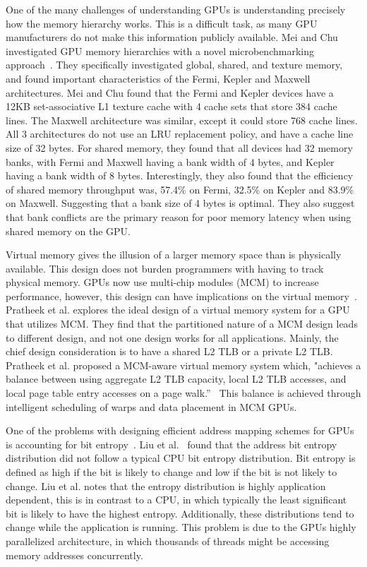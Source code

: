 One of the many challenges of understanding GPUs is understanding precisely how the memory hierarchy works.
This is a difficult task, as many GPU manufacturers do not make this information publicly available.
Mei and Chu investigated GPU memory hierarchies with a novel microbenchmarking approach~\cite{Mei2015}.
They specifically investigated global, shared, and texture memory, and found important characteristics of the Fermi, Kepler and Maxwell architectures.
Mei and Chu found that the Fermi and Kepler devices have a 12KB set-associative L1 texture cache with 4 cache sets that store 384 cache lines.
The Maxwell architecture was similar, except it could store 768 cache lines.
All 3 architectures do not use an LRU replacement policy, and have a cache line size of 32 bytes.
For shared memory, they found that all devices had 32 memory banks, with Fermi and Maxwell having a bank width of 4 bytes, and Kepler having a bank width of 8 bytes.
Interestingly, they also found that the efficiency of shared memory throughput was, 57.4\% on Fermi, 32.5\% on Kepler and 83.9\% on Maxwell.
Suggesting that a bank size of 4 bytes is optimal.
They also suggest that bank conflicts are the primary reason for poor memory latency when using shared memory on the GPU.

Virtual memory gives the illusion of a larger memory space than is physically available.
This design does not burden programmers with having to track physical memory.
GPUs now use multi-chip modules (MCM) to increase performance, however, this design can have implications on the virtual memory~\cite{Pratheek2023}.
Pratheek et al. explores the ideal design of a virtual memory system for a GPU that utilizes MCM.
They find that the partitioned nature of a MCM design leads to different design, and not one design works for all applications.
Mainly, the chief design consideration is to have a shared L2 TLB or a private L2 TLB.
Pratheek et al. proposed a MCM-aware virtual memory system which, "achieves a balance between using aggregate L2 TLB capacity, local L2 TLB accesses, and local page table entry accesses on a page walk.''~\cite{Pratheek2023}
This balance is achieved through intelligent scheduling of warps and data placement in MCM GPUs.

One of the problems with designing efficient address mapping schemes for GPUs is accounting for bit entropy~\cite{Liu2018}.
Liu et al.~\cite{Liu2018} found that the address bit entropy distribution did not follow a typical CPU bit entropy distribution.
Bit entropy is defined as high if the bit is likely to change and low if the bit is not likely to change.
Liu et al. notes that the entropy distribution is highly application dependent, this is in contrast to a CPU, in which typically the least significant bit is likely to have the highest entropy.
Additionally, these distributions tend to change while the application is running.
This problem is due to the GPUs highly parallelized architecture, in which thousands of threads might be accessing memory addresses concurrently.

